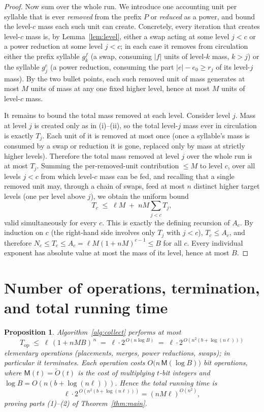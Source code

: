 \documentclass{amsart}
\newtheorem{proposition}{Proposition}
\theoremstyle{definition}
\begin{document}
\begin{proof}
Now sum over the whole run. We introduce one accounting unit per syllable that is ever
\emph{removed} from the prefix $P$ or \emph{reduced} as a power, and bound the level-$c$ mass
each such unit can create. Concretely, every iteration that creates level-$c$ mass is, by
Lemma~\ref{lem:level}, either a swap acting at some level $j<c$ or a power reduction at some
level $j<c$; in each case it removes from circulation either the prefix syllable $g_k^{f}$
(a swap, consuming $|f|$ units of level-$k$ mass, $k>j$) or the syllable $g_j^{e}$ (a power
reduction, consuming the part $|e|-e_0\ge r_j$ of its level-$j$ mass). By the two bullet
points, each such removed unit of mass generates at most $M$ units of mass at any one fixed
higher level, hence at most $M$ units of level-$c$ mass.

It remains to bound the total mass removed at each level. Consider level $j$. Mass at level
$j$ is created only as in (i)--(ii), so the total level-$j$ mass ever in circulation is exactly
$T_j$. Each unit of it is removed at most once (once a syllable's mass is consumed by a swap or
reduction it is gone, replaced only by mass at strictly higher levels). Therefore the total
mass removed at level $j$ over the whole run is at most $T_j$. Summing the per-removed-unit
contribution $\le M$ to level $c$, over all levels $j<c$ from which level-$c$ mass can be fed,
and recalling that a single removed unit may, through a chain of swaps, feed at most $n$
distinct higher target levels (one per level above $j$), we obtain the uniform bound
\[
T_c\;\le\;\ell M\;+\;nM\sum_{j<c}T_j ,
\]
valid simultaneously for every $c$. This is exactly the defining recursion of $A_c$. By
induction on $c$ (the right-hand side involves only $T_j$ with $j<c$), $T_c\le A_c$, and
therefore $N_c\le T_c\le A_c=\ell M(1+nM)^{c-1}\le B$ for all $c$. Every individual exponent
has absolute value at most the mass of its level, hence at most $B$.
\end{proof}

\section{Number of operations, termination, and total running time}\label{sec:steps}

\begin{proposition}\label{prop:steps}
Algorithm~\ref{alg:collect} performs at most
\begin{equation}\label{eq:totalsteps}
T_{\mathrm{op}}\;\le\;\ell\,(1+nMB)^{\,n}\;=\;\ell\cdot 2^{\,O(n\log B)}\;=\;\ell\cdot 2^{\,O(n^2(b+\log(n\ell)))}
\end{equation}
elementary operations \textup{(}placements, merges, power reductions, swaps\textup{)}; in
particular it terminates. Each operation costs $O\!\bigl(n\,\mathsf M(\log B)\bigr)$ bit
operations, where $\mathsf M(t)=\widetilde O(t)$ is the cost of multiplying $t$-bit integers
and $\log B=O(n(b+\log(n\ell)))$. Hence the total running time is
\[
\ell\cdot 2^{\,O(n^2(b+\log(n\ell)))}=(nM\ell)^{O(n^2)},
\]
proving parts \textup{(1)}--\textup{(2)} of Theorem~\ref{thm:main}.
\end{proposition}
\end{document}
